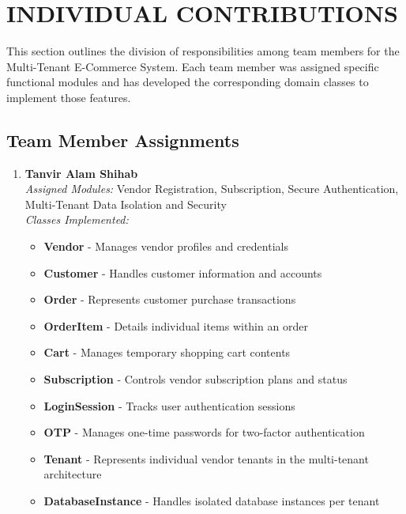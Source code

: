 \chapter{INDIVIDUAL CONTRIBUTIONS} \label{ch:data}


This section outlines the division of responsibilities among team members for the Multi-Tenant E-Commerce System. Each team member was assigned specific functional modules and has developed the corresponding domain classes to implement those features.

\section*{Team Member Assignments}

\begin{enumerate}

\item \textbf{Tanvir Alam Shihab} \\
\textit{Assigned Modules:} Vendor Registration, Subscription, Secure Authentication, Multi-Tenant Data Isolation and Security \\
\textit{Classes Implemented:} 
\begin{itemize}
    \item \textbf{Vendor} - Manages vendor profiles and credentials
    \item \textbf{Customer} - Handles customer information and accounts
    \item \textbf{Order} - Represents customer purchase transactions
    \item \textbf{OrderItem} - Details individual items within an order
    \item \textbf{Cart} - Manages temporary shopping cart contents
    \item \textbf{Subscription} - Controls vendor subscription plans and status
    \item \textbf{LoginSession} - Tracks user authentication sessions
    \item \textbf{OTP} - Manages one-time passwords for two-factor authentication
    \item \textbf{Tenant} - Represents individual vendor tenants in the multi-tenant architecture
    \item \textbf{DatabaseInstance} - Handles isolated database instances per tenant
\end{itemize}


\end{enumerate}

